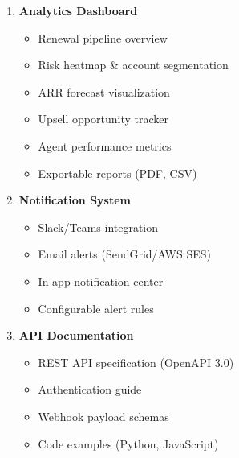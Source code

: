\documentclass[12pt,a4paper]{article}
\begin{document}
\begin{enumerate}
\begin{itemize}
        \item Multi-channel recommendation system
    \end{itemize}
    \item \textbf{Analytics Dashboard}
    \begin{itemize}
        \item Renewal pipeline overview
        \item Risk heatmap \& account segmentation
        \item ARR forecast visualization
        \item Upsell opportunity tracker
        \item Agent performance metrics
        \item Exportable reports (PDF, CSV)
    \end{itemize}
    \item \textbf{Notification System}
    \begin{itemize}
        \item Slack/Teams integration
        \item Email alerts (SendGrid/AWS SES)
        \item In-app notification center
        \item Configurable alert rules
    \end{itemize}
    \item \textbf{API Documentation}
    \begin{itemize}
        \item REST API specification (OpenAPI 3.0)
        \item Authentication guide
        \item Webhook payload schemas
        \item Code examples (Python, JavaScript)
    \end{itemize}
\end{enumerate}
\end{document}
